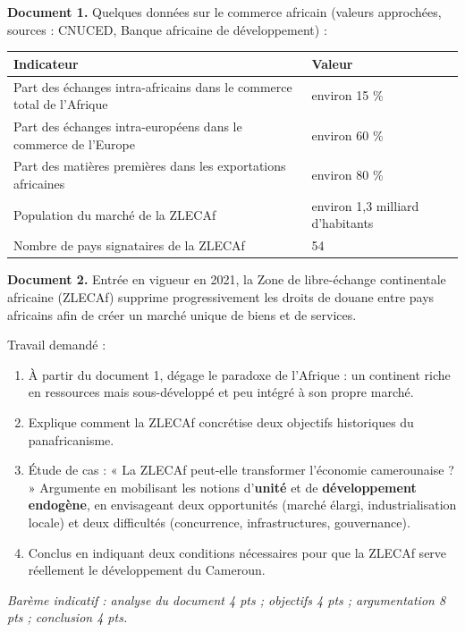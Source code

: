 \documentclass[11pt]{article}
\begin{document}
\begin{exercice}
\textbf{Document 1.} Quelques données sur le commerce africain (valeurs approchées, sources : CNUCED, Banque africaine de développement) :

\begin{center}
\begin{tabularx}{\linewidth}{|X|X|}
\hline
\rowcolor{popblueL} \textbf{Indicateur} & \textbf{Valeur} \\
\hline
Part des échanges intra-africains dans le commerce total de l'Afrique & environ 15 \% \\
\hline
Part des échanges intra-européens dans le commerce de l'Europe & environ 60 \% \\
\hline
Part des matières premières dans les exportations africaines & environ 80 \% \\
\hline
Population du marché de la ZLECAf & environ 1,3 milliard d'habitants \\
\hline
Nombre de pays signataires de la ZLECAf & 54 \\
\hline
\end{tabularx}
\end{center}

\textbf{Document 2.} Entrée en vigueur en 2021, la Zone de libre-échange continentale africaine (ZLECAf) supprime progressivement les droits de douane entre pays africains afin de créer un marché unique de biens et de services.

Travail demandé :
\begin{enumerate}
\item À partir du document 1, dégage le paradoxe de l'Afrique : un continent riche en ressources mais sous-développé et peu intégré à son propre marché.
\item Explique comment la ZLECAf concrétise deux objectifs historiques du panafricanisme.
\item Étude de cas : « La ZLECAf peut-elle transformer l'économie camerounaise ? » Argumente en mobilisant les notions d'\textbf{unité} et de \textbf{développement endogène}, en envisageant deux opportunités (marché élargi, industrialisation locale) et deux difficultés (concurrence, infrastructures, gouvernance).
\item Conclus en indiquant deux conditions nécessaires pour que la ZLECAf serve réellement le développement du Cameroun.
\end{enumerate}
\emph{Barème indicatif : analyse du document 4 pts ; objectifs 4 pts ; argumentation 8 pts ; conclusion 4 pts.}
\end{exercice}
\end{document}
